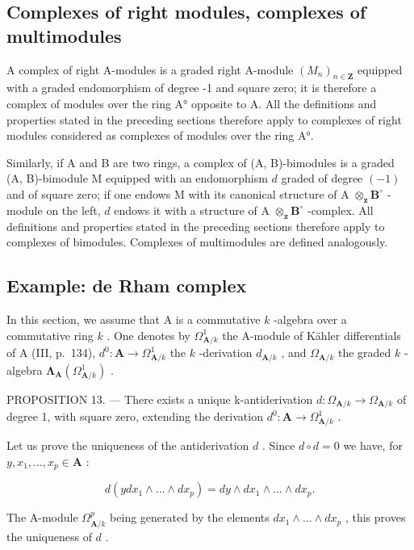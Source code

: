 \subsection{Complexes of right modules, complexes of multimodules}

A complex of right A-modules is a graded right A-module \((M_{n})_{n\in\mathbf{Z}}\) equipped with a graded endomorphism of degree -1 and square zero; it is therefore a complex of modules over the ring A° opposite to A. All the definitions and properties stated in the preceding sections therefore apply to complexes of right modules considered as complexes of modules over the ring A°.

Similarly, if A and B are two rings, a complex of (A, B)-bimodules is a graded (A, B)-bimodule M equipped with an endomorphism \(d\) graded of degree \((-1)\) and of square zero; if one endows M with its canonical structure of A \(\otimes_{\mathbf{z}} \mathbf{B}^{\circ}\) -module on the left, \(d\) endows it with a structure of A \(\otimes_{\mathbf{z}} \mathbf{B}^{\circ}\) -complex. All definitions and properties stated in the preceding sections therefore apply to complexes of bimodules. Complexes of multimodules are defined analogously.

\subsection{Example: de Rham complex}

In this section, we assume that A is a commutative \(k\) -algebra over a commutative ring \(k\) . One denotes by \(\Omega_{\mathbf{A}/k}^{1}\) the A-module of Kähler differentials of A (III, p.~134), \(d^{0}: \mathbf{A} \to \Omega_{\mathbf{A}/k}^{1}\) the \(k\) -derivation \(d_{\mathbf{A}/k}\) , and \(\Omega_{\mathbf{A}/k}\) the graded \(k\) -algebra \(\boldsymbol{\Lambda}_{\mathbf{A}}(\Omega_{\mathbf{A}/k}^{1})\) .

PROPOSITION 13. — There exists a unique k-antiderivation \(d: \Omega_{\mathbf{A}/k} \to \Omega_{\mathbf{A}/k}\) of degree 1, with square zero, extending the derivation \(d^{0}: \mathbf{A} \to \Omega_{\mathbf{A}/k}^{1}\) .

Let us prove the uniqueness of the antiderivation \(d\) . Since \(d \circ d = 0\) we have, for \(y, x_1, \ldots, x_p \in \mathbf{A}\) :

\[
d \left(y d x _ {1} \wedge \dots \wedge d x _ {p}\right) = d y \wedge d x _ {1} \wedge \dots \wedge d x _ {p}.
\]

The A-module \(\Omega_{\mathbf{A}/k}^{p}\) being generated by the elements \(dx_{1} \wedge \ldots \wedge dx_{p}\) , this proves the uniqueness of \(d\) .

